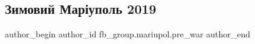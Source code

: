  
 
 
 
 

\subsection{Зимовий Маріуполь 2019}
\label{sec:11_02_2023.fb.fb_group.mariupol.pre_war.10.zimovii_mar_upol_201}

\ifcmt
 author_begin
   author_id fb_group.mariupol.pre_war
 author_end
\fi
